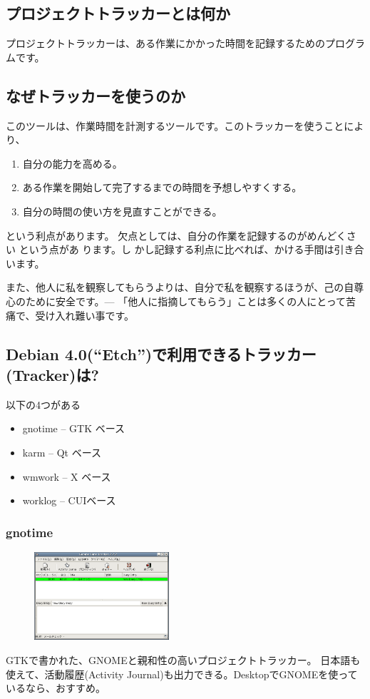 \documentclass[mingoth,a4paper]{jsarticle}
\begin{document}
\subsection{プロジェクトトラッカーとは何か}
プロジェクトトラッカーは、ある作業にかかった時間を記録するためのプログラムです。
\subsection{なぜトラッカーを使うのか}
このツールは、作業時間を計測するツールです。このトラッカーを使うことにより、

\begin{enumerate}
 \item 自分の能力を高める。
 \item ある作業を開始して完了するまでの時間を予想しやすくする。
 \item 自分の時間の使い方を見直すことができる。
\end{enumerate}

という利点があります。
欠点としては、自分の作業を{\large 記録するのがめんどくさい }という点があ
ります。{\large し
かし記録する利点に比べれば、かける手間は引き合います。}

また、他人に私を観察してもらうよりは、自分で私を観察するほうが、己の自尊
心のために安全です。--- 「他人に指摘してもらう」ことは多くの人にとって苦
痛で、受け入れ難い事です。

\subsection{Debian 4.0(“Etch”)で利用できるトラッカー(Tracker)は?}
以下の4つがある

\begin{itemize}
 \item  gnotime -- GTK ベース
 \item  karm -- Qt ベース
 \item  wmwork -- X ベース
 \item  worklog -- CUIベース
\end{itemize}

\subsubsection{gnotime}
\begin{figure}\includegraphics[width=5cm]{image200704/gnotime.png}\end{figure}
GTKで書かれた、GNOMEと親和性の高いプロジェクトトラッカー。
日本語も使えて、活動履歴(Activity Journal)も出力できる。DesktopでGNOMEを使っているなら、おすすめ。
\end{document}
